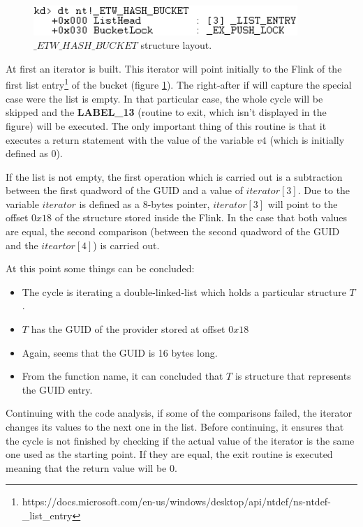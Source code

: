   \begin{centering}
  \begin{figure}[H]
    \includegraphics[width=10cm]{images/_etw_hash_bucket_structure.png}
    \caption[]{$\_ETW\_HASH\_BUCKET$ structure layout.}
    \label{fig:etwhashbucketlayout}
  \end{figure}
  \end{centering}

  At first an iterator is built. This iterator will point initially to the Flink of the first list entry\footnote{https://docs.microsoft.com/en-us/windows/desktop/api/ntdef/ns-ntdef-\_list\_entry} of the bucket (figure \ref{fig:etwhashbucketlayout}). The right-after if will capture the special case were the list is empty. In that particular case, the whole cycle will be skipped and the {\bfseries LABEL\_13} (routine to exit, which isn't displayed in the figure) will be executed. The only important thing of this routine is that it executes a return statement with the value of the variable $v4$ (which is initially defined as 0).

  If the list is not empty, the first operation which is carried out is a subtraction between the first quadword of the GUID and a value of $iterator[3]$. Due to the variable $iterator$ is defined as a 8-bytes pointer, $iterator[3]$ will point to the offset $0x18$ of the structure stored inside the Flink. In the case that both values are equal, the second comparison (between the second quadword of the GUID and the $iteartor[4]$) is carried out. 

  At this point some things can be concluded:
  \begin{itemize}
  \item The cycle is iterating a double-linked-list which holds a particular structure $T$.
  \item $T$ has the GUID of the provider stored at offset $0x18$
  \item Again, seems that the GUID is 16 bytes long.
  \item From the function name, it can concluded that $T$ is structure that represents the GUID entry.
  \end{itemize}

  Continuing with the code analysis, if some of the comparisons failed, the iterator changes its values to the next one in the list. Before continuing, it ensures that the cycle is not finished by checking if the actual value of the iterator is the same one used as the starting point. If they are equal, the exit routine is executed meaning that the return value will be 0.

